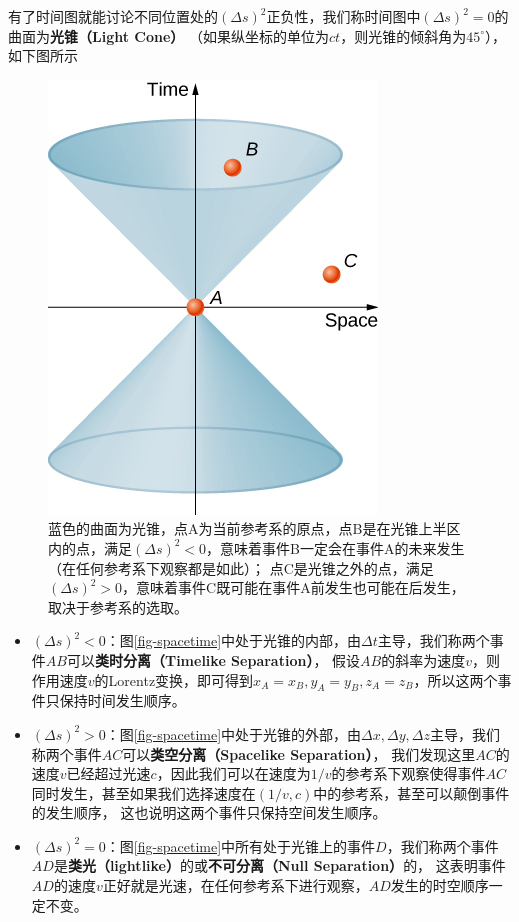 \documentclass[12pt, a4paper, oneside]{ctexart}
\numberwithin{equation}{section}  %
\begin{document}
有了时间图就能讨论不同位置处的$(\Delta s)^2$正负性，我们称时间图中$(\Delta s)^2=0$的曲面为\textbf{光锥（Light Cone）}
（如果纵坐标的单位为$ct$，则光锥的倾斜角为$45^\circ$），如下图所示
\begin{figure}[htbp]
    \centering
    \includegraphics[scale=1.0]{light_cone.jpg}
    \caption{蓝色的曲面为光锥，点A为当前参考系的原点，点B是在光锥上半区内的点，满足$(\Delta s)^2 < 0$，意味着事件B一定会在事件A的未来发生（在任何参考系下观察都是如此）；
    点C是光锥之外的点，满足$(\Delta s)^2 > 0$，意味着事件C既可能在事件A前发生也可能在后发生，取决于参考系的选取。}
\end{figure}

\begin{itemize}
    \item $(\Delta s)^2 < 0$：图\ref{fig-spacetime}中处于光锥的内部，由$\Delta t$主导，我们称两个事件$AB$可以\textbf{类时分离（Timelike Separation）}，
    假设$AB$的斜率为速度$v$，则作用速度$v$的Lorentz变换，即可得到$x_A=x_B,y_A=y_B,z_A=z_B$，所以这两个事件只保持时间发生顺序。
    \item $(\Delta s)^2 > 0$：图\ref{fig-spacetime}中处于光锥的外部，由$\Delta x,\Delta y,\Delta z$主导，我们称两个事件$AC$可以\textbf{类空分离（Spacelike Separation）}，
    我们发现这里$AC$的速度$v$已经超过光速$c$，因此我们可以在速度为$1/v$的参考系下观察使得事件$AC$同时发生，甚至如果我们选择速度在$(1/v,c)$中的参考系，甚至可以颠倒事件的发生顺序，
    这也说明这两个事件只保持空间发生顺序。
    \item $(\Delta s)^2 = 0$：图\ref{fig-spacetime}中所有处于光锥上的事件$D$，我们称两个事件$AD$是\textbf{类光（lightlike）}的或\textbf{不可分离（Null Separation）}的，
    这表明事件$AD$的速度$v$正好就是光速，在任何参考系下进行观察，$AD$发生的时空顺序一定不变。
\end{itemize}
\end{document}

